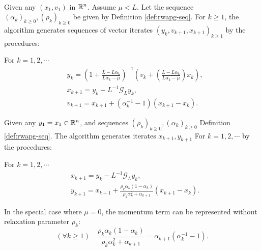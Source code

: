 \documentclass[12pt]{article}
\begin{document}
        \begin{definition}\label{def:r-wapg-st-form} \; \\
            Given any $(x_1, v_1)$ in $\mathbb R^n$. 
            Assume $\mu < L$.
            Let the sequence $(\alpha_k)_{k \ge 0}, (\rho_k)_{k\ge 0}$ be given by Definition \ref{def:rwapg-seq}. 
            For $k \ge 1$, the algorithm generates sequences of vector iterates $(y_k, v_{k + 1}, x_{k + 1})_{k \ge 1}$ by the procedures: 
            \begin{tcolorbox}
                For $k=1, 2, \cdots $
                \begin{align*}
                    & y_k = 
                    \left(
                        1 + \frac{L - L\alpha_k}{L\alpha_k - \mu}
                    \right)^{-1}
                    \left(
                        v_k + 
                        \left(\frac{L - L\alpha_k}{L\alpha_k - \mu} \right) x_k
                    \right), 
                    \\
                    & x_{k + 1} = 
                    y_k - L^{-1} \mathcal G_L y_k, 
                    \\
                    & v_{k + 1} = 
                    x_{k + 1} + (\alpha_k^{-1} -1)(x_{k + 1} - x_k). 
                \end{align*}    
            \end{tcolorbox}
        \end{definition}
        \begin{definition}\label{def:r-wapg-momentum-form}
            Given any $y_1 = x_1 \in \mathbb R^n$, and sequences $(\rho_k)_{k \ge 0}, (\alpha_k)_{k\ge 0}$ Definition \ref{def:rwapg-seq}. 
            The algorithm generates iterates $x_{k + 1}, y_{k + 1}$ For $k = 1, 2, \cdots $ by the procedures: 
            \begin{tcolorbox}
                For $k=1, 2,\cdots $
                \begin{align*}
                    & x_{k + 1} = y_k - L^{-1}\mathcal G_Ly_k, 
                    \\
                    & 
                    y_{k + 1} = 
                    x_{k + 1} + 
                    \frac{\rho_k\alpha_k(1 - \alpha_k)}{\rho_k\alpha_k^2 + \alpha_{k + 1}}(x_{k + 1} - x_k). 
                \end{align*}    
            \end{tcolorbox}
            In the special case where $\mu = 0$, the momentum term can be represented without relaxation parameter $\rho_k$: 
            $$
                (\forall k \ge 1)\quad \frac{\rho_k\alpha_k(1 - \alpha_k)}{\rho_k\alpha_k^2 + \alpha_{k + 1}} 
                = \alpha_{k + 1}(\alpha_k^{-1} - 1).  
            $$
        \end{definition}
        \begin{remark}
        \end{remark}
\end{document}
